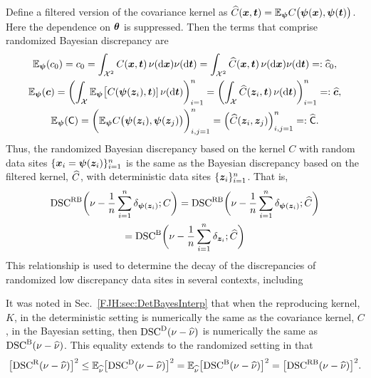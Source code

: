 \documentclass[graybox,footinfo]{svmult}
\begin{document}
Define a filtered version of the covariance kernel as $\widehat{C}({\boldsymbol{x}},{\boldsymbol{t}}) = {\mathbb{E}}_{{\boldsymbol{\psi}}} 
C\bigl({\boldsymbol{\psi}}({\boldsymbol{x}}), {\boldsymbol{\psi}}({\boldsymbol{t}}) \bigr)$.  Here the dependence on ${\boldsymbol{\theta}}$ is 
suppressed.  Then the terms that comprise randomized 
Bayesian discrepancy are
\begin{subequations} \label{FJH:eq:filCvecmatdef}
	\begin{gather}
	 {\mathbb{E}}_{{\boldsymbol{\psi}}}(c_0)  = c_0 =  \int_{{\mathcal{X}}^2} C({\boldsymbol{x}},{\boldsymbol{t}}) \, \nu(\mathrm{d} {\boldsymbol{x}}) \nu(\mathrm{d} 
	 {\boldsymbol{t}}) = 
	 \int_{{\mathcal{X}}^2} \widehat{C}({\boldsymbol{x}},{\boldsymbol{t}}) \, \nu(\mathrm{d} {\boldsymbol{x}}) \nu(\mathrm{d} {\boldsymbol{t}}) =: \widehat{c}_0, \\
	 {\mathbb{E}}_{{\boldsymbol{\psi}}}({\boldsymbol{c}}) = 
	\biggl( \int_{{\mathcal{X}}} 
	{\mathbb{E}}_{{\boldsymbol{\psi}}}\bigl[C({\boldsymbol{\psi}}({\boldsymbol{z}}_i),{\boldsymbol{t}})] \,\nu(\mathrm{d} {\boldsymbol{t}}) \biggr)_{i=1}^n = 
	\biggl( \int_{{\mathcal{X}}} 
	\widehat{C}({\boldsymbol{z}}_i,{\boldsymbol{t}}) \,\nu(\mathrm{d} {\boldsymbol{t}}) \biggr)_{i=1}^n = : \widehat{{\boldsymbol{c}}}, \\
	 {\mathbb{E}}_{{\boldsymbol{\psi}}}(\mathsf{C})  = \biggl(  {\mathbb{E}}_{{\boldsymbol{\psi}}} 
	 C\bigl({\boldsymbol{\psi}}({\boldsymbol{z}}_i), {\boldsymbol{\psi}}({\boldsymbol{z}}_j) \bigr) \biggr)_{i,j=1}^n = \Bigl( \widehat{C}({\boldsymbol{z}}_i,{\boldsymbol{z}}_j) 
	 \Bigr)_{i,j=1}^n =: \widehat{\mathsf{C}}.
	\end{gather}
\end{subequations}
Thus, the randomized Bayesian discrepancy based on the kernel $C$ with random data 
sites $\{{\boldsymbol{x}}_i = {\boldsymbol{\psi}}({\boldsymbol{z}}_i)\}_{i=1}^n$ is the same as the Bayesian discrepancy based 
on the filtered kernel, $\widehat{C}$, with deterministic data sites $\{{\boldsymbol{z}}_i\}_{i=1}^n$.  That is, 
\begin{multline}
\textup{DSC}^{\textup{R}\textup{B}}\biggl(\nu - \frac 1n \sum_{i=1}^n \delta_{{\boldsymbol{\psi}}({\boldsymbol{z}}_i)} ; C\biggr) = 
\textup{DSC}^{\textup{R}\textup{B}}\biggl(\nu - \frac 1n \sum_{i=1}^n \delta_{{\boldsymbol{\psi}}({\boldsymbol{z}}_i)} ; \widehat{C}\biggr) \\
=
\textup{DSC}^{\textup{B}}\biggl(\nu - 
\frac 1n \sum_{i=1}^n \delta_{{\boldsymbol{z}}_i} ; \widehat{C} \biggr)
\end{multline}
This relationship is used to determine the decay of the discrepancies of randomized low 
discrepancy data sites in several contexts, including \cite{???}

It was noted in Sec.\ \ref{FJH:sec:DetBayesInterp} that when the reproducing kernel, 
$K$, in the deterministic setting is numerically the same as the covariance kernel, $C$, 
in the Bayesian setting, then $\textup{DSC}^{\textup{D}}(\nu - \widehat{\nu})$ is numerically the same as 
$\textup{DSC}^{\textup{B}}(\nu - \widehat{\nu})$.  This equality extends to the randomized setting in that 
\begin{equation*}
\bigl[\textup{DSC}^{\textup{R}}(\nu - \widehat{\nu})\bigr]^2 \le {\mathbb{E}}_{\widehat{\nu}} \bigl[\textup{DSC}^{\textup{D}}(\nu - \widehat{\nu})\bigr]^2 = 
{\mathbb{E}}_{\widehat{\nu}} \bigl[\textup{DSC}^{\textup{B}}(\nu - 
\widehat{\nu})\bigr]^2 = \bigl[\textup{DSC}^{\textup{R}\textup{B}}(\nu - \widehat{\nu})\bigr]^2.
\end{equation*}
\end{document}
